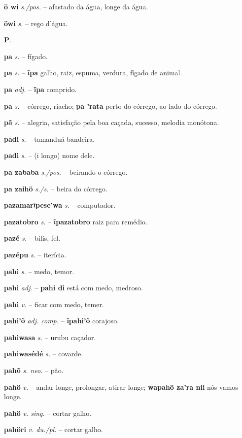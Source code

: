 \textbf{ö wi} \textit{s./pos.} -- afastado da água, longe da água.

\textbf{öwi} \textit{s.} -- rego d'água.



\textbf{P}.



\textbf{pa} \textit{s.} -- fígado.

\textbf{pa} \textit{s.} -- \textbf{ĩpa} galho, raiz, espuma, verdura, fígado de animal.

\textbf{pa} \textit{adj.} -- \textbf{ĩpa} comprido.

\textbf{pa} \textit{s.} -- córrego, riacho; \textbf{pa 'rata} perto do córrego, ao lado do córrego.

\textbf{pã} \textit{s.} -- alegria, satisfação pela boa caçada, sucesso, melodia monótona.

\textbf{padi} \textit{s.} -- tamanduá bandeira.

\textbf{padi} \textit{s.} -- (i longo) nome dele.

\textbf{pa zababa} \textit{s./pos.} -- beirando o córrego.

\textbf{pa zaihö} \textit{s./s.} -- beira do córrego.

\textbf{pazamarĩpese'wa} \textit{s.} -- computador.

\textbf{pazatobro} \textit{s.} -- \textbf{ĩpazatobro} raiz para remédio.

\textbf{pazé} \textit{s.} -- bilis, fel.

\textbf{pazépu} \textit{s.} -- iterícia.

\textbf{pahi} \textit{s.} -- medo, temor.

\textbf{pahi} \textit{adj.} -- \textbf{pahi di} está com medo, medroso.

\textbf{pahi} \textit{v.} -- ficar com medo, temer.

\textbf{pahi'õ} \textit{adj. comp.} -- \textbf{ĩpahi'õ} corajoso.

\textbf{pahiwasa} \textit{s.} -- urubu caçador.

\textbf{pahiwasédé} \textit{s.} -- covarde.

\textbf{pahõ} \textit{s. neo.} -- pão.

\textbf{pahö} \textit{v.} -- andar longe, prolongar, atirar longe; \textbf{wapahö za'ra nii} nós vamos longe.

\textbf{pahö} \textit{v. sing.} -- cortar galho.

\textbf{pahöri} \textit{v. du./pl.} -- cortar galho.

